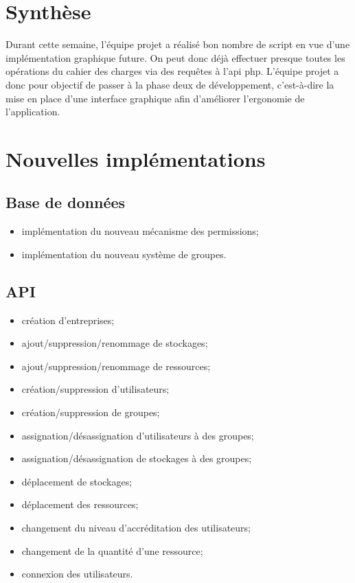 \documentclass[a4paper, 12pt]{report}
\begin{document}
	\tableofcontents


	\newpage

	\chapter*{Synthèse}
		Durant cette semaine, l’équipe projet a réalisé bon nombre de script en vue d’une implémentation graphique future. On peut donc déjà effectuer presque toutes les opérations du cahier des charges via des requêtes à l’api php. L’équipe projet a donc pour objectif de passer à la phase deux de développement, c’est-à-dire la mise en place d’une interface graphique afin d’améliorer l’ergonomie de l’application.


	 \chapter{Nouvelles implémentations}
		\section{Base de données}
			\begin{itemize}
				\item implémentation du nouveau mécanisme des permissions;
				\item implémentation du nouveau système de groupes.
			\end{itemize}

		\section{API}
			\begin{itemize}
				\item création d’entreprises;
				\item ajout/suppression/renommage de stockages;
				\item ajout/suppression/renommage de ressources;
				\item création/suppression d’utilisateurs;
				\item création/suppression de groupes;
				\item assignation/désassignation d’utilisateurs à des groupes;
				\item assignation/désassignation de stockages à des groupes;
				\item déplacement de stockages;
				\item déplacement des ressources;
				\item changement du niveau d’accréditation des utilisateurs;
				\item changement de la quantité d’une ressource;
				\item connexion des utilisateurs.
			\end{itemize}
\end{document}
